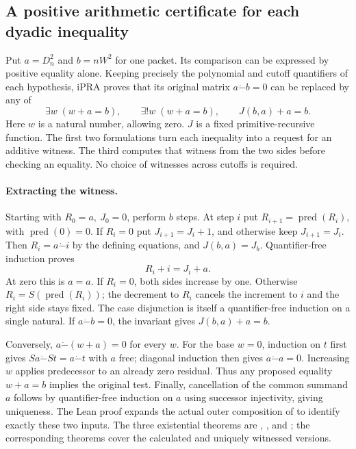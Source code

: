 \subsection{A positive arithmetic certificate for each dyadic inequality}\label{sec:slack}
Put \(a=D_n^2\) and \(b=nW^2\) for one packet. Its comparison can be expressed by positive equality alone. Keeping precisely the polynomial and cutoff quantifiers of each hypothesis, iPRA proves that its original matrix \(a\mathbin{\dot-}b=0\) can be replaced by any of
\[
  \exists w\;(w+a=b),\qquad
  \exists! w\;(w+a=b),\qquad
  J(b,a)+a=b.
\]
Here \(w\) is a natural number, allowing zero. \(J\) is a fixed primitive-recursive function. The first two formulations turn each inequality into a request for an additive witness. The third computes that witness from the two sides before checking an equality. No choice of witnesses across cutoffs is required.

\paragraph{Extracting the witness.}
Starting with \(R_0=a,\ J_0=0\), perform \(b\) steps. At step \(i\) put \(R_{i+1}=\operatorname{pred}(R_i)\), with \(\operatorname{pred}(0)=0\). If \(R_i=0\) put \(J_{i+1}=J_i+1\), and otherwise keep \(J_{i+1}=J_i\). Then \(R_i=a\mathbin{\dot-}i\) by the defining equations, and \(J(b,a)=J_b\). Quantifier-free induction proves
\[
                        R_i+i=J_i+a .
\]
At zero this is \(a=a\). If \(R_i=0\), both sides increase by one. Otherwise \(R_i=S(\operatorname{pred}(R_i))\); the decrement to \(R_i\) cancels the increment to \(i\) and the right side stays fixed. The case disjunction is itself a quantifier-free induction on a single natural. If \(a\mathbin{\dot-}b=0\), the invariant gives \(J(b,a)+a=b\).

Conversely, \(a\mathbin{\dot-}(w+a)=0\) for every \(w\). For the base \(w=0\), induction on \(t\) first gives \(Sa\mathbin{\dot-}St=a\mathbin{\dot-}t\) with \(a\) free; diagonal induction then gives \(a\mathbin{\dot-}a=0\). Increasing \(w\) applies predecessor to an already zero residual. Thus any proposed equality \(w+a=b\) implies the original test. Finally, cancellation of the common summand \(a\) follows by quantifier-free induction on \(a\) using successor injectivity, giving uniqueness. The Lean proof expands the actual outer composition of  to identify exactly these two inputs. The three existential theorems are , , and ; the corresponding  theorems cover the calculated and uniquely witnessed versions.
